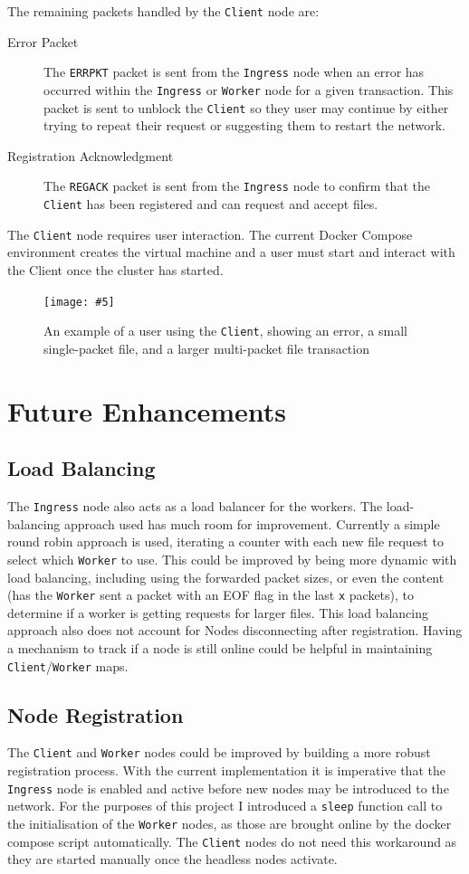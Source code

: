 \documentclass{article}
\newcommand{\includescalefigure}[5]{
\begin{figure}[htb]
\centering
\texttt{[image: \#5]}
\captionsetup{width=.8\linewidth} 
\caption[#2]{#3}
\label{#1}
\end{figure}
}
\newcommand{\code}[1]{\texttt{#1}}
\begin{document}
The remaining packets handled by the \code{Client} node are:
\begin{description}
	\item[Error Packet] The \code{ERRPKT} packet is sent from the \code{Ingress} node when an error has occurred within the \code{Ingress} or \code{Worker} node for a given transaction. This packet is sent to unblock the \code{Client} so they user may continue by either trying to repeat their request or suggesting them to restart the network.
	\item[Registration Acknowledgment] The \code{REGACK} packet is sent from the \code{Ingress} node to confirm that the \code{Client} has been registered and can request and accept files. 
\end{description}
The \code{Client} node requires user interaction. The current Docker Compose environment creates the virtual machine and a user must start and interact with the Client once the cluster has started.
\includescalefigure{fig:client_example}{Client Example}{An example of a user using the \code{Client}, showing an error, a small single-packet file, and a larger multi-packet file transaction}{0.8}{client1.png}

\section{Future Enhancements}
\label{sec:future_enhancements}
\subsection{Load Balancing}
The \code{Ingress} node also acts as a load balancer for the workers. The load-balancing approach used has much room for improvement. Currently a simple round robin approach is used, iterating a counter with each new file request to select which \code{Worker} to use. This could be improved by being more dynamic with load balancing, including using the forwarded packet sizes, or even the content (has the \code{Worker} sent a packet with an EOF flag in the last \code{x} packets), to determine if a worker is getting requests for larger files. This load balancing approach also does not account for Nodes disconnecting after registration. Having a mechanism to track if a node is still online could be helpful in maintaining \code{Client}/\code{Worker} maps.

\subsection{Node Registration}
The \code{Client} and \code{Worker} nodes could be improved by building a more robust registration process. With the current implementation it is imperative that the \code{Ingress} node is enabled and active before new nodes may be introduced to the network. For the purposes of this project I introduced a \code{sleep} function call to the initialisation of the \code{Worker} nodes, as those are brought online by the docker compose script automatically. The \code{Client} nodes do not need this workaround as they are started manually once the headless nodes activate. 
\end{document}

